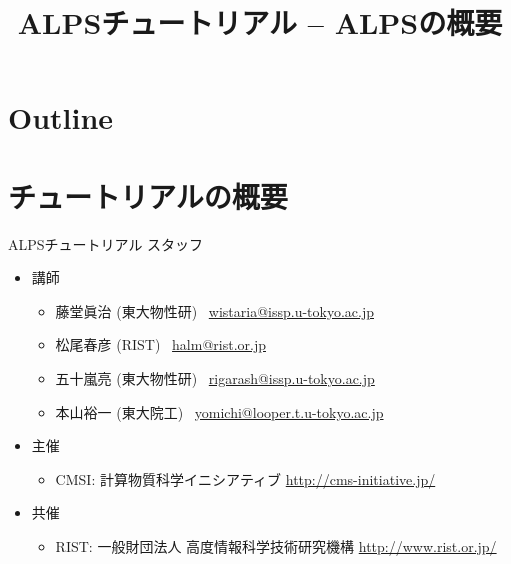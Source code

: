 \title{ALPSチュートリアル -- ALPSの概要}



\begin{frame}
  \titlepage
\end{frame}

\section*{Outline}
\begin{frame}
  \tableofcontents
\end{frame}


\section{チュートリアルの概要}

\begin{frame}{ALPSチュートリアル スタッフ}
  \begin{itemize}
  \item 講師
    \begin{itemize}
    \item 藤堂眞治 (東大物性研) \ \href{mailto:wistaria@issp.u-tokyo.ac.jp}{wistaria@issp.u-tokyo.ac.jp}
    \item 松尾春彦 (RIST) \ \href{mailto:halm@rist.or.jp}{halm@rist.or.jp}
    \item 五十嵐亮 (東大物性研) \ \href{mailto:rigarash@issp.u-tokyo.ac.jp}{rigarash@issp.u-tokyo.ac.jp}
    \item 本山裕一 (東大院工) \ \href{mailto:yomichi@looper.t.u-tokyo.ac.jp}{yomichi@looper.t.u-tokyo.ac.jp}
    \end{itemize}
  \item 主催
    \begin{itemize}
    \item CMSI: 計算物質科学イニシアティブ \url{http://cms-initiative.jp/}
    \end{itemize}
  \item 共催
    \begin{itemize}
    \item RIST: 一般財団法人 高度情報科学技術研究機構 \url{http://www.rist.or.jp/}
    \end{itemize}
  \end{itemize}
\end{frame}


